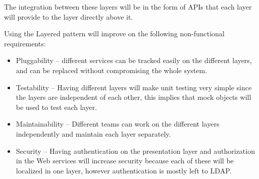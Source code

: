 \documentclass[a4paper]{article}
\begin{document}
The integration between these layers will be in the form of APIs that each layer will provide to the layer directly above it.

Using the Layered pattern will improve on the following non-functional requirements:
\begin{itemize}
			\item Pluggability – different services can be tracked easily on the different layers, and can be replaced without compromising the whole system.
			\item Testability – Having different layers will make unit testing very simple since the layers are independent of each other, this implies that mock objects will be used to test each layer.
			\item Maintainability – Different teams can work on the different layers independently and maintain each layer separately.
			\item Security – Having authentication on the presentation layer and authorization in the Web services will increase security because each of these will be localized in one layer, however authentication is mostly left to LDAP.   \\[1em]
\end{itemize}
\end{document}
